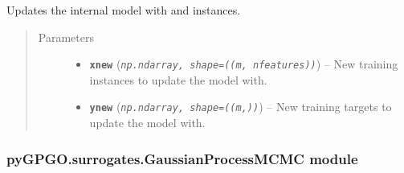 \documentclass[letterpaper,10pt,english]{sphinxmanual}
\begin{document}
\begin{fulllineitems}
\begin{fulllineitems}
\label{pyGPGO.surrogates.GaussianProcess:pyGPGO.surrogates.GaussianProcess.GaussianProcess.update}
Updates the internal model with  and  instances.
\begin{quote}\begin{description}
\item[{Parameters}] \leavevmode\begin{itemize}
\item {} 
\textbf{\texttt{xnew}} (\emph{\texttt{np.ndarray, shape=((m, nfeatures))}}) -- New training instances to update the model with.

\item {} 
\textbf{\texttt{ynew}} (\emph{\texttt{np.ndarray, shape=((m,))}}) -- New training targets to update the model with.

\end{itemize}

\end{description}\end{quote}

\end{fulllineitems}


\end{fulllineitems}



\subsubsection{pyGPGO.surrogates.GaussianProcessMCMC module}
\label{pyGPGO.surrogates.GaussianProcessMCMC:pygpgo-surrogates-gaussianprocessmcmc-module}\label{pyGPGO.surrogates.GaussianProcessMCMC::doc}\label{pyGPGO.surrogates.GaussianProcessMCMC:module-pyGPGO.surrogates.GaussianProcessMCMC}
\end{document}
